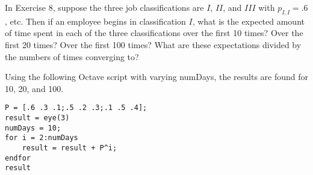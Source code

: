 \documentclass[10pt,a4paper]{exam}
\begin{document}
\begin{questions}
\pagebreak
\question In Exercise 8, suppose the three job classifications are $I$, $II$, and $III$ with $p_{I,I} = .6$, etc. Then if an employee begins in classification $I$, what is the expected amount of time spent in each of the three classifications over the first 10 times? Over the first 20 times? Over the first 100 times? What are these expectations divided by the numbers of times converging to?

\begin{solution}
Using the following Octave script with varying numDays, the results are found for 10, 20, and 100.
\begin{verbatim}
P = [.6 .3 .1;.5 .2 .3;.1 .5 .4];
result = eye(3)
numDays = 10;
for i = 2:numDays
    result = result + P^i;
endfor
result
\end{verbatim}


\end{solution}
\end{questions}
\end{document}
